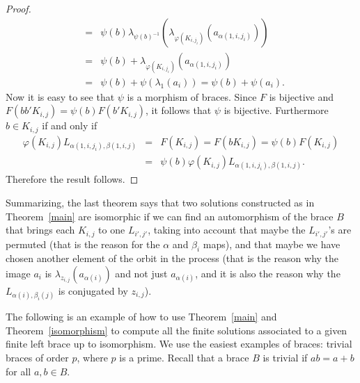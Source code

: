 \begin{proof}
\begin{eqnarray*}
		&=&\psi(b)\lambda_{\psi(b)^{-1}}(\lambda_{\varphi(K_{i,j_i})}(a_{\alpha(1,i,j_i)}))\\
		&=&\psi(b)+\lambda_{\varphi(K_{i,j_i})}(a_{\alpha(1,i,j_i)})\\
		&=&\psi(b)+\psi(\lambda_{1}(a_i))=\psi(b)+\psi(a_i).
	\end{eqnarray*}
	Now it is easy to see that $\psi$ is a morphism of  braces.
	Since $F$ is bijective and $F(bb'K_{i,j})=\psi(b)F(b'K_{i,j})$, it
	follows that $\psi$ is bijective. Furthermore $b\in K_{i,j}$ if and
	only if
	\begin{eqnarray*}
		\varphi(K_{i,j})L_{\alpha(1,i,j_i),\beta(1,i,j)}&=&F(K_{i,j})=F(bK_{i,j})=\psi(b)F(K_{i,j})\\
		&=&\psi(b)\varphi(K_{i,j})L_{\alpha(1,i,j_i),\beta(1,i,j)}.
	\end{eqnarray*}
	Therefore the result follows.
\end{proof}

Summarizing, the last theorem says that two solutions constructed as
in Theorem~\ref{main} are isomorphic if we can find an automorphism
of the brace $B$ that brings each $K_{i,j}$ to one $L_{i',j'}$,
taking into account that maybe the $L_{i',j'}$'s are permuted (that
is the reason for the $\alpha$ and $\beta_i$ maps), and that maybe
we have chosen another element of the orbit in the process (that is
the reason why the image $a_i$ is $\lambda_{z_{i,j}}(a_{\alpha(i)})$
and not just $a_{\alpha(i)}$, and it is also the reason why the
$L_{\alpha(i),\beta_i(j)}$ is conjugated by $z_{i,j}$).


The following is an example of how to use  Theorem~\ref{main} and
Theorem~\ref{isomorphism} to compute all the finite solutions
associated to a given finite left brace up to isomorphism. We use
the easiest examples of braces: trivial braces of order $p$, where
$p$ is a prime. Recall that a brace $B$ is trivial if $ab=a+b$
for all $a,b\in B$.

